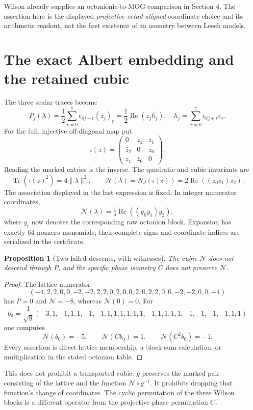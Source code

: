 \documentclass[10pt,reqno]{amsart}
\newtheorem{proposition}[theorem]{Proposition}
\theoremstyle{remark}\newtheorem{remark}[theorem]{Remark}
\begin{document}
Wilson already supplies an octonionic-to-MOG comparison in Section 4. The assertion here is the displayed \emph{projective-octad-aligned} coordinate choice and its arithmetic readout, not the first existence of an isometry between Leech models.

\section{The exact Albert embedding and the retained cubic}
The three scalar traces become
\begin{equation}\label{eq:traces}
P_j(\lambda)=\frac12\sum_{r=0}^7\epsilon_{8j+r}(z_j)_r
=\frac12\operatorname{Re}(z_j\overline{h_j}),\quad
h_j=\sum_{r=0}^7\epsilon_{8j+r}e_r.
\end{equation}
For the full, injective off-diagonal map put
\[
\iota(z)=\begin{pmatrix}0&z_2&\bar z_1\\\bar z_2&0&z_0\\z_1&\bar z_0&0\end{pmatrix}.
\]
Reading the marked entries is the inverse. The quadratic and cubic invariants are
\[
\operatorname{Tr}(\iota(z)^2)=4\|\lambda\|^2,\qquad
\mathcal N(\lambda)=N_J(\iota(z))=2\operatorname{Re}((z_0z_1)z_2).
\]
The association displayed in the last expression is fixed. In integer numerator coordinates,
\[
\mathcal N(\lambda)=\tfrac14\operatorname{Re}((y_0y_1)y_2),
\]
where $y_i$ now denotes the corresponding raw octonion block. Expansion has exactly 64 nonzero monomials; their complete signs and coordinate indices are serialized in the certificate.

\begin{proposition}[Two failed descents, with witnesses]\label{prop:cubic}
The cubic $\mathcal N$ does not descend through $P$, and the specific phase isometry $C$ does not preserve $\mathcal N$.
\end{proposition}
\begin{proof}
The lattice numerator
\[
(-4,2,2,0,0,-2,-2,2,2,0,2,0,0,2,0,2,2,0,0,-2,-2,0,0,-4)
\]
has $P=0$ and $\mathcal N=-8$, whereas $\mathcal N(0)=0$. For
\[
b_0=\frac1{\sqrt8}(-3,1,-1,1,1,-1,-1,1,1,1,1,1,1,-1,1,1,1,1,-1,-1,-1,-1,1,1)
\]
one computes
\[
\mathcal N(b_0)=-5,\qquad\mathcal N(Cb_0)=1,\qquad\mathcal N(C^2b_0)=-1.
\]
Every assertion is direct lattice membership, a block-sum calculation, or multiplication in the stated octonion table.
\end{proof}
This does not prohibit a transported cubic: $g$ preserves the marked pair consisting of the lattice and the function $\mathcal N\circ g^{-1}$. It prohibits dropping that function's change of coordinates. The cyclic permutation of the three Wilson blocks is a different operator from the projective phase permutation $C$.
\end{document}
